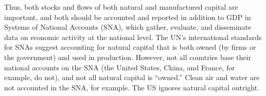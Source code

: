 





Thus, both stocks and flows of 
both natural and manufactured capital are important, 
and both should be accounted and reported in addition to GDP 
in Systems of National Accounts (SNA), which gather, evaluate, 
and disseminate data on economic activity at the national level. 
The UN's international standards for SNAs suggest
accounting for natural capital that is both owned 
(by firms or the government) and used in production.
However, not all countries base their national accounts on the SNA 
(the United States, China, and France, for example, do not), 
and not all natural capital is ``owned.'' 
Clean air and water are not accounted in the SNA, for example. 
The US ignores natural capital outright.

